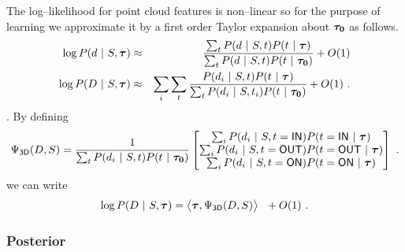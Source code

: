 The log--likelihood for point cloud features  is
non--linear so for the purpose of learning we approximate it by a
first order Taylor expansion about $\IndModelo$ as follows.
\begin{eqnarray}
  \log P(\Depth~|~\Seam,\IndModel)
  &\approx&
  \frac
      {\sum_{\Ind} P(\Depth~|~\Seam,\Ind) P(\Ind~|~\IndModel)}
      {\sum_{\Ind} P(\Depth~|~\Seam,\Ind) P(\Ind~|~\IndModelo)} + O(1)\\
  \log P(\Depths~|~\Seam,\IndModel)
  &\approx&
  \sum_i \sum_{\Ind} \frac
      {P(\Depth_i~|~\Seam,\Ind) P(\Ind~|~\IndModel)}
      {\sum_{\Ind} P(\Depth_i~|~\Seam,\Ind_i) P(\Ind~|~\IndModelo)} + O(1) ~.
\end{eqnarray}
. By
defining
\begin{equation}
  \JointFtr_{\textsf{3D}}(\Depths,\Seam) =
  \frac{1}{\sum_{\Ind} P(\Depth_i~|~\Seam,\Ind) P(\Ind~|~\IndModelo)}
  \begin{bmatrix}
    \sum_i P(\Depth_i~|~\Seam,\Ind=\IN) P(\Ind=\IN~|~\IndModel) \\
    \sum_i P(\Depth_i~|~\Seam,\Ind=\OUT) P(\Ind=\OUT~|~\IndModel) \\
    \sum_i P(\Depth_i~|~\Seam,\Ind=\ON) P(\Ind=\ON~|~\IndModel)
  \end{bmatrix}~.
\end{equation}
we can write
\begin{equation}
  \label{eq:linear-pt-model}
  \log P(\Depths~|~\Seam,\IndModel)
  =
  \bigl\langle
    \IndModel, \JointFtr_{\textsf{3D}}(\Depths,\Seam)
  \bigr\rangle ~~ + O(1) ~.
\end{equation}

\subsubsection{Posterior}

